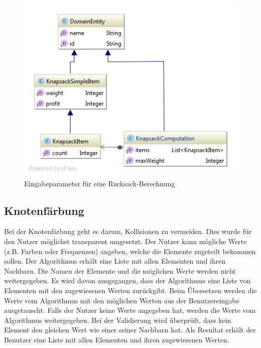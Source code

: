 \begin{figure}[h]
\centering
\includegraphics[scale=0.5]{images/probleme/knapsack.png}
\caption[Eingabeparameter für eine Rucksack-Berechnung]{Eingabeparameter für eine Rucksack-Berechnung \selfmade{}}
\label{fig:knapsack_input}
\end{figure}

\FloatBarrier

%
%
%
%

\subsection{Knotenfärbung}
Bei der Knotenfärbung geht es darum, Kollisionen zu vermeiden. Dies wurde für den Nutzer möglichst transparent umgesetzt. Der Nutzer kann mögliche Werte (z.B. Farben oder 
Frequenzen) angeben, welche die Elemente zugeteilt bekommen sollen. Der Algorithmus erhält eine Liste mit allen Elementen und ihren Nachbarn. Die Namen der Elemente und die möglichen 
Werte werden nicht weitergegeben. Es wird davon ausgegangen, dass der Algorithmus eine Liste von Elementen mit den zugewiesenen Werten zurückgibt. Beim Übersetzen werden 
die Werte vom Algorithmus mit den möglichen Werten aus der Benutzereingabe ausgetauscht. Falls der Nutzer keine Werte angegeben hat, werden die Werte vom Algorithmus weitergegeben. 
Bei der Validierung wird überprüft, dass kein Element den gleichen Wert wie einer seiner Nachbarn hat. Als Resultat erhält der Benutzer eine Liste mit allen Elementen und ihren zugewiesenen 
Werten.

